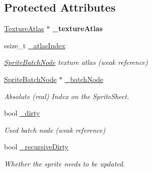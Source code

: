 \subsection*{Protected Attributes}
\begin{DoxyCompactItemize}
\item 
\mbox{\label{classSprite_a1cbbb26e8fdd4c736eda062b8df61509}} 
\hyperlink{classTextureAtlas}{Texture\+Atlas} $\ast$ {\bfseries \+\_\+texture\+Atlas}
\item 
\mbox{\label{classSprite_a88a0764838564f05efbaf6364729e621}} 
ssize\+\_\+t \hyperlink{classSprite_a88a0764838564f05efbaf6364729e621}{\+\_\+atlas\+Index}
\begin{DoxyCompactList}\small\item\em \hyperlink{classSpriteBatchNode}{Sprite\+Batch\+Node} texture atlas (weak reference) \end{DoxyCompactList}\item 
\mbox{\label{classSprite_a46e2bae9af24d2d89d25ae2ff7289f50}} 
\hyperlink{classSpriteBatchNode}{Sprite\+Batch\+Node} $\ast$ \hyperlink{classSprite_a46e2bae9af24d2d89d25ae2ff7289f50}{\+\_\+batch\+Node}
\begin{DoxyCompactList}\small\item\em Absolute (real) Index on the Sprite\+Sheet. \end{DoxyCompactList}\item 
\mbox{\label{classSprite_a11054601545daabe7e8c0f70440240e8}} 
bool \hyperlink{classSprite_a11054601545daabe7e8c0f70440240e8}{\+\_\+dirty}
\begin{DoxyCompactList}\small\item\em Used batch node (weak reference) \end{DoxyCompactList}\item 
\mbox{\label{classSprite_a6a08f67beac1c30b7186ac8b0504d633}} 
bool \hyperlink{classSprite_a6a08f67beac1c30b7186ac8b0504d633}{\+\_\+recursive\+Dirty}
\begin{DoxyCompactList}\small\item\em Whether the sprite needs to be updated. \end{DoxyCompactList}\item 
\mbox{\label{classSprite_a0824643df9102b3d72aeffff1d94e8bf}} 

\end{DoxyCompactItemize}
